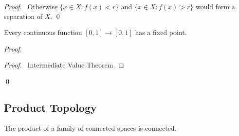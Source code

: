 \begin{proof}
\pf\ Otherwise $\{ x \in X : f(x) < r \}$ and $\{x \in X : f(x) > r \}$ would form a separation of $X$. \qed
\end{proof}

\begin{cor}
Every continuous function $[0,1] \rightarrow [0,1]$ has a fixed point.
\end{cor}

\begin{proof}
\pf
{}
\begin{proof}
	\pf\ Intermediate Value Theorem.
\end{proof}
\qed
\end{proof}
\subsection{Product Topology}

\begin{prop}
The product of a family of connected spaces is connected.
\end{prop}

